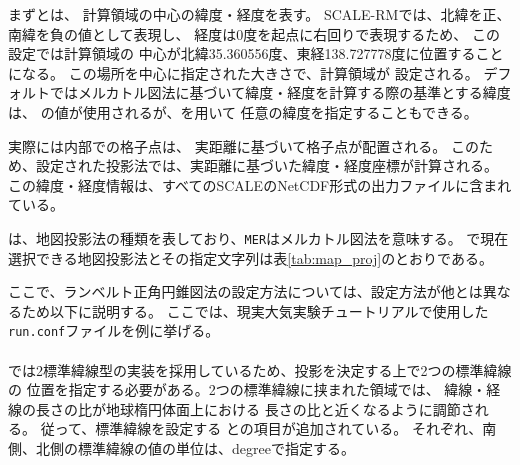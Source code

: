 \noindent
まずとは、
計算領域の中心の緯度・経度を表す。
SCALE-RMでは、北緯を正、南緯を負の値として表現し、
経度は0度を起点に右回りで表現するため、
この設定では計算領域の
中心が北緯35.360556度、東経138.727778度に位置することになる。
この場所を中心に指定された大きさで、計算領域が
設定される。
デフォルトではメルカトル図法に基づいて緯度・経度を計算する際の基準とする緯度は、
の値が使用されるが、を用いて
任意の緯度を指定することもできる。



実際には\scalerm 内部での格子点は、
実距離に基づいて格子点が配置される。
このため、設定された投影法では、実距離に基づいた緯度・経度座標が計算される。
この緯度・経度情報は、すべてのSCALEのNetCDF形式の出力ファイルに含まれている。



は、地図投影法の種類を表しており、\verb|MER|はメルカトル図法を意味する。
\scalerm で現在選択できる地図投影法とその指定文字列は表\ref{tab:map_proj}のとおりである。


ここで、ランベルト正角円錐図法の設定方法については、設定方法が他とは異なるため以下に説明する。
ここでは、現実大気実験チュートリアルで使用した\verb|run.conf|ファイルを例に挙げる。\\

\\

\scalerm では2標準緯線型の実装を採用しているため、投影を決定する上で2つの標準緯線の
位置を指定する必要がある。2つの標準緯線に挟まれた領域では、
緯線・経線の長さの比が地球楕円体面上における
長さの比と近くなるように調節される。
従って、標準緯線を設定する
との項目が追加されている。
それぞれ、南側、北側の標準緯線の値の単位は、degreeで指定する。

